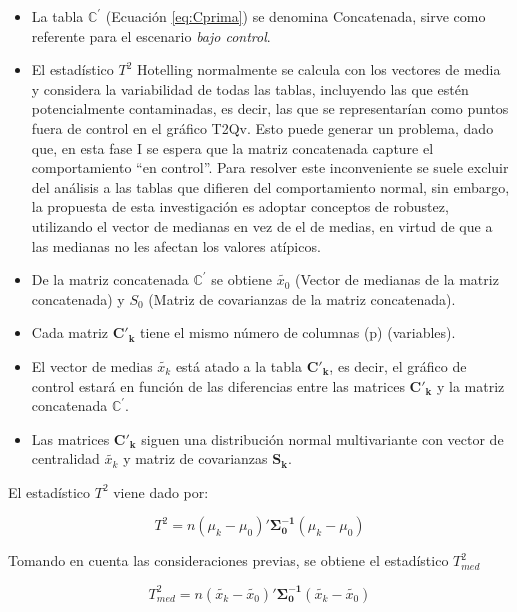 \documentclass[mathematics,article,submit,moreauthors,pdftex]{mdpi}
\providecommand{\tightlist}{%
  \setlength{\itemsep}{0pt}\setlength{\parskip}{4pt}}
\begin{document}
\begin{itemize}
\tightlist
\item
  La tabla \(\mathbb{C}^{'}\) (Ecuación \ref{eq:Cprima}) se denomina
  Concatenada, sirve como referente para el escenario \emph{bajo
  control}.
\item
  El estadístico \(T^2\) Hotelling normalmente se calcula con los
  vectores de media y considera la variabilidad de todas las tablas,
  incluyendo las que estén potencialmente contaminadas, es decir, las
  que se representarían como puntos fuera de control en el gráfico T2Qv.
  Esto puede generar un problema, dado que, en esta fase I se espera que
  la matriz concatenada capture el comportamiento ``en control''. Para
  resolver este inconveniente se suele excluir del análisis a las tablas
  que difieren del comportamiento normal, sin embargo, la propuesta de
  esta investigación es adoptar conceptos de robustez, utilizando el
  vector de medianas en vez de el de medias, en virtud de que a las
  medianas no les afectan los valores atípicos.
\item
  De la matriz concatenada \(\mathbb{C}^{'}\) se obtiene
  \(\tilde{x_{0}}\) (Vector de medianas de la matriz concatenada) y
  \(S_0\) (Matriz de covarianzas de la matriz concatenada).
\item
  Cada matriz \(\mathbf{C'_k}\) tiene el mismo número de columnas (p)
  (variables).
\item
  El vector de medias \(\tilde{x_{k}}\) está atado a la tabla
  \(\mathbf{C'_k}\), es decir, el gráfico de control estará en función
  de las diferencias entre las matrices \(\mathbf{C'_k}\) y la matriz
  concatenada \(\mathbf{\mathbb{C^{'}}}\).
\item
  Las matrices \(\mathbf{C'_k}\) siguen una distribución normal
  multivariante con vector de centralidad \(\tilde{x_{k}}\) y matriz de
  covarianzas \(\mathbf{S_k}\).
\end{itemize}

El estadístico \(T^2\) viene dado por:

\begin{equation}
T^2=n (\mu_{k}-\mu_{0})'\mathbf{\Sigma_{0}^{-1}}(\mu_{k}-\mu_{0})
\label{eq:T2}
\end{equation}

Tomando en cuenta las consideraciones previas, se obtiene el estadístico
\(T^2_{med}\)

\begin{equation}
T^2_{med}=n (\tilde{x_{k}}-\tilde{x_{0}})'\mathbf{\Sigma_{0}^{-1}}(\tilde{x_{k}}-\tilde{x_{0}})
\label{eq:T2med}
\end{equation}
\end{document}
